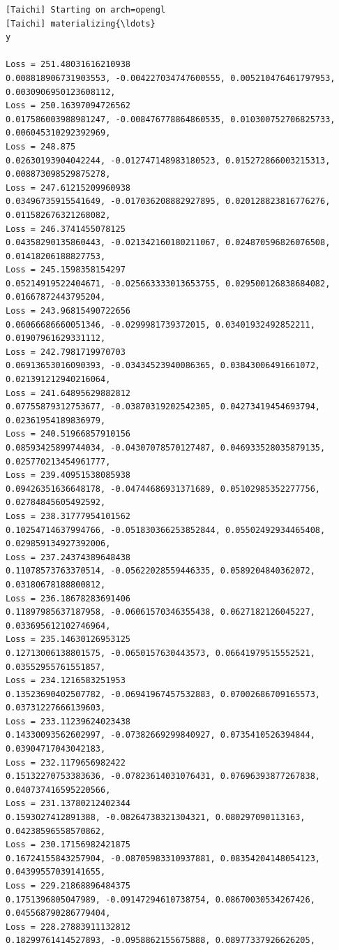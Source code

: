 \documentclass[11pt]{article}
\begin{document}
    \begin{Verbatim}[commandchars=\\\{\}]
[Taichi] Starting on arch=opengl
[Taichi] materializing{\ldots}
y

Loss = 251.48031616210938
0.008818906731903553, -0.004227034747600555, 0.005210476461797953,
0.0030906950123608112,
Loss = 250.16397094726562
0.017586003988981247, -0.008476778864860535, 0.010300752706825733,
0.006045310292392969,
Loss = 248.875
0.02630193904042244, -0.012747148983180523, 0.015272866003215313,
0.008873098529875278,
Loss = 247.61215209960938
0.03496735915541649, -0.017036208882927895, 0.020128823816776276,
0.011582676321268082,
Loss = 246.3741455078125
0.04358290135860443, -0.021342160180211067, 0.024870596826076508,
0.01418206188827753,
Loss = 245.1598358154297
0.05214919522404671, -0.025663333013653755, 0.029500126838684082,
0.01667872443795204,
Loss = 243.96815490722656
0.06066686660051346, -0.0299981739372015, 0.03401932492852211,
0.01907961629331112,
Loss = 242.7981719970703
0.06913653016090393, -0.03434523940086365, 0.03843006491661072,
0.021391212940216064,
Loss = 241.64895629882812
0.07755879312753677, -0.03870319202542305, 0.04273419454693794,
0.02361954189836979,
Loss = 240.51966857910156
0.08593425899744034, -0.04307078570127487, 0.046933528035879135,
0.025770213454961777,
Loss = 239.40951538085938
0.09426351636648178, -0.04744686931371689, 0.05102985352277756,
0.02784845605492592,
Loss = 238.31777954101562
0.10254714637994766, -0.051830366253852844, 0.05502492934465408,
0.029859134927392006,
Loss = 237.24374389648438
0.11078573763370514, -0.05622028559446335, 0.0589204840362072,
0.03180678188800812,
Loss = 236.18678283691406
0.11897985637187958, -0.06061570346355438, 0.0627182126045227,
0.033695612102746964,
Loss = 235.14630126953125
0.12713006138801575, -0.0650157630443573, 0.06641979515552521,
0.03552955761551857,
Loss = 234.1216583251953
0.13523690402507782, -0.06941967457532883, 0.07002686709165573,
0.03731227666139603,
Loss = 233.11239624023438
0.14330093562602997, -0.07382669299840927, 0.0735410526394844,
0.03904717043042183,
Loss = 232.1179656982422
0.15132270753383636, -0.07823614031076431, 0.07696393877267838,
0.040737416595220566,
Loss = 231.13780212402344
0.1593027412891388, -0.08264738321304321, 0.080297090113163,
0.04238596558570862,
Loss = 230.17156982421875
0.16724155843257904, -0.08705983310937881, 0.08354204148054123,
0.04399557039141655,
Loss = 229.21868896484375
0.1751396805047989, -0.09147294610738754, 0.08670030534267426,
0.045568790286779404,
Loss = 228.27883911132812
0.18299761414527893, -0.0958862155675888, 0.08977337926626205,

\end{Verbatim}
\end{document}
